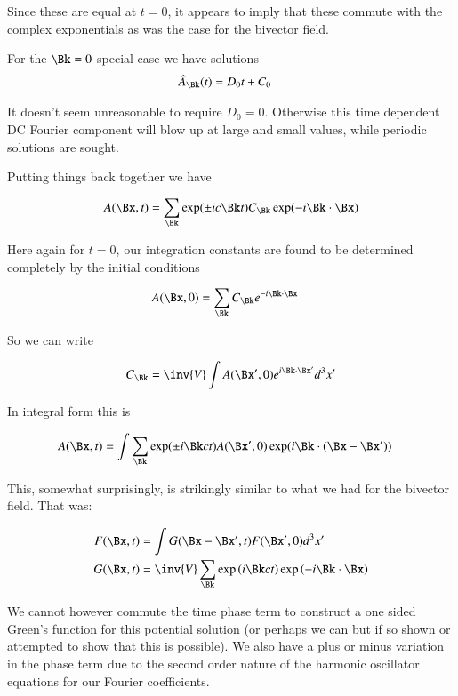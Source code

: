 Since these are equal at $t=0$, it appears to imply that these commute with the
complex exponentials as was the case for the bivector field.

For the $\Bk = 0$ special case we have solutions
\begin{align*}
\hat{A}_{\Bk}(t) &= D_0 t + C_0
\end{align*}

It doesn't seem unreasonable to require $D_0 = 0$.  Otherwise this time dependent DC Fourier component will blow up at large and small values, while periodic
solutions are sought.

Putting things back together we have %

\begin{align*}
A(\Bx, t) &= \sum_{\Bk} \exp(\pm i c \Bk t) C_{\Bk} \exp( -i \Bk \cdot \Bx ) \\
\end{align*}

Here again for $t=0$, our integration constants are found to be determined completely by the initial conditions

\begin{align}
A(\Bx, 0) &= \sum_{\Bk} C_{\Bk} e^{ -i \Bk \cdot \Bx}
\end{align}

So we can write

\begin{align*}
C_{\Bk} = \inv{V} \int A(\Bx', 0) e^{ i \Bk \cdot \Bx'} d^3 x'
\end{align*}

In integral form this is

\begin{align}\label{eqn:potential_fourier:potentialSolution}
A(\Bx, t) &= \int \sum_{\Bk} \exp(\pm i \Bk c t ) A(\Bx', 0) \exp( i \Bk \cdot (\Bx -\Bx') )
\end{align}

This, somewhat surprisingly, is strikingly similar to what we had for the bivector field.  That was:

\begin{align}\label{eqn:potential_fourier:bivectorSolution}
F(\Bx,t) &= \int G(\Bx - \Bx', t) F(\Bx', 0) d^3 x' \\
G(\Bx,t) &= \inv{V} \sum_{\Bk} \exp\left( i \Bk ct \right) \exp\left( -i \Bk \cdot \Bx \right)
\end{align}

We cannot however
commute the time phase term to construct a one sided Green's function for this
potential solution (or perhaps we can but if so shown or attempted to show that this is possible).  We also have a 
plus or minus variation in the phase term due to the second order nature of the harmonic oscillator equations for our Fourier coefficients.

